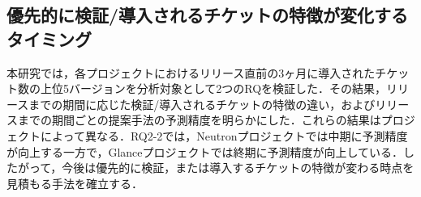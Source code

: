 \documentclass[T,J]{fose} %
\begin{document}

\subsection{優先的に検証/導入されるチケットの特徴が変化するタイミング}\label{secsec:glance_review}
本研究では，各プロジェクトにおけるリリース直前の3ヶ月に導入されたチケット数の上位5バージョンを分析対象として2つのRQを検証した．その結果，リリースまでの期間に応じた検証/導入されるチケットの特徴の違い，およびリリースまでの期間ごとの提案手法の予測精度を明らかにした．これらの結果はプロジェクトによって異なる．RQ2-2では，Neutronプロジェクトでは中期に予測精度が向上する一方で，Glanceプロジェクトでは終期に予測精度が向上している．したがって，今後は優先的に検証，または導入するチケットの特徴が変わる時点を見積もる手法を確立する．



\end{document}
